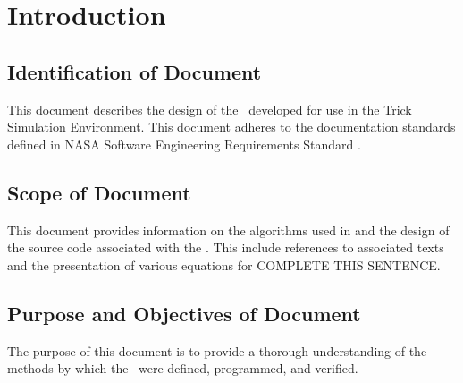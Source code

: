 \documentclass[twoside,11pt,titlepage]{report}
\begin{document}

\date{DATE}
\modelname{\MODEL}
\author{YOUR NAME}
\makeTrickhlaenvTitlepage



\tableofcontents
\vfill

\pagebreak


\chapter{Introduction}\label{sec:intro}



\section{Identification of Document}
This document describes the design of the \MODEL\ developed
for use in the Trick Simulation Environment.
This document adheres to the documentation standards
defined in NASA Software Engineering Requirements Standard \cite{NASA:SWE}.

\section{Scope of Document}
This document provides information on the algorithms used in and
the design of the source code associated with the \MODEL.
This include references to associated texts and the presentation
of various equations for COMPLETE THIS SENTENCE.

\section{Purpose and Objectives of Document}
The purpose of this document is to provide a thorough understanding of the
methods by which the \MODEL\ were defined, programmed, and verified.
\end{document}
